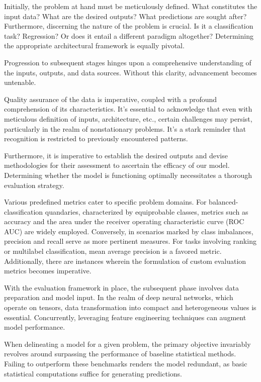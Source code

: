 \documentclass[12pt]{article}
\begin{document}
Initially, the problem at hand must be meticulously defined. What constitutes the input data? What are the desired outputs? What predictions are sought after? Furthermore, discerning the nature of the problem is crucial. Is it a classification task? Regression? Or does it entail a different paradigm altogether? Determining the appropriate architectural framework is equally pivotal.

Progression to subsequent stages hinges upon a comprehensive understanding of the inputs, outputs, and data sources. Without this clarity, advancement becomes untenable.

Quality assurance of the data is imperative, coupled with a profound comprehension of its characteristics. It's essential to acknowledge that even with meticulous definition of inputs, architecture, etc., certain challenges may persist, particularly in the realm of nonstationary problems. It's a stark reminder that recognition is restricted to previously encountered patterns.

Furthermore, it is imperative to establish the desired outputs and devise methodologies for their assessment to ascertain the efficacy of our model. Determining whether the model is functioning optimally necessitates a thorough evaluation strategy.

Various predefined metrics cater to specific problem domains. For balanced-classification quandaries, characterized by equiprobable classes, metrics such as accuracy and the area under the receiver operating characteristic curve (ROC AUC) are widely employed. Conversely, in scenarios marked by class imbalances, precision and recall serve as more pertinent measures. For tasks involving ranking or multilabel classification, mean average precision is a favored metric. Additionally, there are instances wherein the formulation of custom evaluation metrics becomes imperative.

With the evaluation framework in place, the subsequent phase involves data preparation and model input. In the realm of deep neural networks, which operate on tensors, data transformation into compact and heterogeneous values is essential. Concurrently, leveraging feature engineering techniques can augment model performance.

When delineating a model for a given problem, the primary objective invariably revolves around surpassing the performance of baseline statistical methods. Failing to outperform these benchmarks renders the model redundant, as basic statistical computations suffice for generating predictions.
\end{document}
